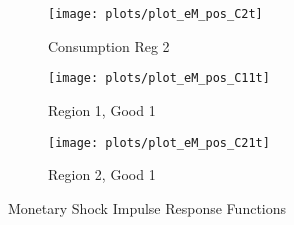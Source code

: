 \documentclass[../thesis.tex]{subfiles}
\begin{document}
\begin{figure}[h!]
		\begin{subfigure}[b]{0.26\textwidth}
			\centering
			\texttt{[image: plots/plot\_eM\_pos\_C2t]}
			\caption{\footnotesize Consumption Reg 2}
			\label{fig:ZMt-C2t}
		\end{subfigure}
		\hfill
		\begin{subfigure}[b]{0.26\textwidth}
			\centering
			\texttt{[image: plots/plot\_eM\_pos\_C11t]}
			\caption{\footnotesize Region 1, Good 1}
			\label{fig:ZMt-C11t}
		\end{subfigure}
		\hfill
		\begin{subfigure}[b]{0.26\textwidth}
			\centering
			\texttt{[image: plots/plot\_eM\_pos\_C21t]}
			\caption{\footnotesize Region 2, Good 1}
			\label{fig:ZMt-C21t}
		\end{subfigure}
		\hfill
		\vspace*{0.5cm}		
		\caption{Monetary Shock Impulse Response Functions}
		\label{fig:ZMt-irf}
	\end{figure}


\newpage
\end{document}
